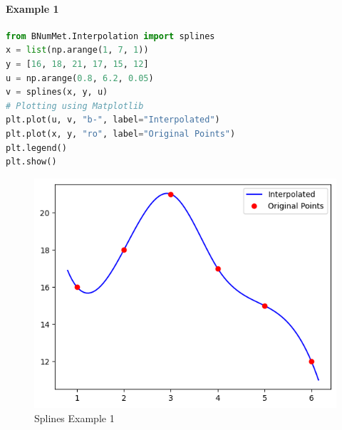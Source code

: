 \paragraph{Example 1}{
\begin{lstlisting}[language=Python]
from BNumMet.Interpolation import splines
x = list(np.arange(1, 7, 1))
y = [16, 18, 21, 17, 15, 12]
u = np.arange(0.8, 6.2, 0.05)
v = splines(x, y, u)
# Plotting using Matplotlib
plt.plot(u, v, "b-", label="Interpolated")
plt.plot(x, y, "ro", label="Original Points")
plt.legend()
plt.show()
\end{lstlisting}
\begin{figure}[H]
    \centering
    \includegraphics{Include/Images/Thesis/Documentation/Interpolation/Splines Example 1.png}
    \caption{Splines Example 1}
    \label{fig:Splines Example 1}
\end{figure}

}